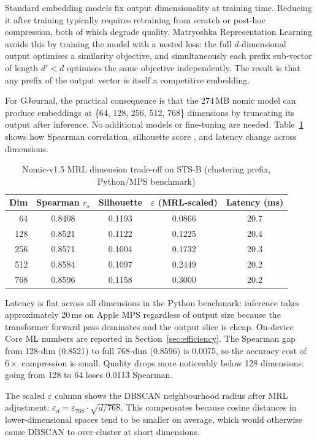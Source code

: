 Standard embedding models fix output dimensionality at training time. Reducing it after training typically requires retraining from scratch or post-hoc compression, both of which degrade quality. Matryoshka Representation Learning \cite{kusupati2022matryoshka} avoids this by training the model with a nested loss: the full $d$-dimensional output optimises a similarity objective, and simultaneously each prefix sub-vector of length $d' < d$ optimises the same objective independently. The result is that any prefix of the output vector is itself a competitive embedding.

For GJournal, the practical consequence is that the 274\,MB nomic model can produce embeddings at \{64, 128, 256, 512, 768\} dimensions by truncating its output after inference. No additional models or fine-tuning are needed. Table~\ref{tab:mrl_tradeoff} shows how Spearman correlation, silhouette score \cite{rousseeuw1987silhouettes}, and latency change across dimensions.

\begin{table}[h]
\centering
\caption{Nomic-v1.5 MRL dimension trade-off on STS-B (clustering prefix, Python/MPS benchmark)}
\label{tab:mrl_tradeoff}
\begin{tabular}{|r|c|c|c|c|}
\hline
\textbf{Dim} & \textbf{Spearman $r_s$} & \textbf{Silhouette} & \textbf{$\varepsilon$ (MRL-scaled)} & \textbf{Latency (ms)} \\
\hline
 64 & 0.8408 & 0.1193 & 0.0866 & 20.7 \\
128 & 0.8521 & 0.1122 & 0.1225 & 20.4 \\
256 & 0.8571 & 0.1004 & 0.1732 & 20.3 \\
512 & 0.8584 & 0.1097 & 0.2449 & 20.2 \\
768 & 0.8596 & 0.1158 & 0.3000 & 20.2 \\
\hline
\end{tabular}
\end{table}

Latency is flat across all dimensions in the Python benchmark: inference takes approximately 20\,ms on Apple MPS regardless of output size because the transformer forward pass dominates and the output slice is cheap. On-device Core ML numbers are reported in Section~\ref{sec:efficiency}. The Spearman gap from 128-dim (0.8521) to full 768-dim (0.8596) is 0.0075, so the accuracy cost of $6\times$ compression is small. Quality drops more noticeably below 128 dimensions: going from 128 to 64 loses 0.0113 Spearman.

The scaled $\varepsilon$ column shows the DBSCAN neighbourhood radius after MRL adjustment: $\varepsilon_d = \varepsilon_{768} \cdot \sqrt{d / 768}$. This compensates because cosine distances in lower-dimensional spaces tend to be smaller on average, which would otherwise cause DBSCAN to over-cluster at short dimensions.

